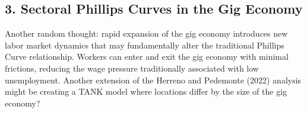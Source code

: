 \documentclass[10pt]{article}
\begin{document}
\subsection*{3. Sectoral Phillips Curves in the Gig Economy}

Another random thought: rapid expansion of the gig economy introduces new labor market dynamics that may fundamentally alter the traditional Phillips Curve relationship. Workers can enter and exit the gig economy with minimal frictions, reducing the wage pressure traditionally associated with low unemployment. Another extension of the Herreno and Pedemonte (2022) analysis might be creating a TANK model where locations differ by the size of the gig economy?
\end{document}
